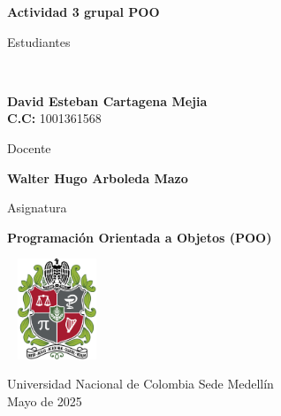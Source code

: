 \begin{titlepage}
	\Large{
	\begin{center}
		\vspace*{1cm}
 
		\textbf{Actividad 3 grupal POO}
 
			 
		\vspace{1.5cm}
		
		Estudiantes
		
		\vspace{0.5cm}
		 \

 
		\textbf{David Esteban Cartagena Mejia} \\
		  \textbf{C.C:} 1001361568 \\	
		  
	 
 
	   \vspace{1cm}
		
		Docente 
		
		\vspace{0.5cm}
 
		\textbf{Walter Hugo Arboleda Mazo}
		\vspace{0.4cm}
		\vspace{1cm}
		
		Asignatura
		
		\vspace{0.5cm}
 
		\textbf{Programación Orientada a Objetos (POO)}
 
		\vfill
 
		\includegraphics[width=3cm,height=3cm]{logo.png}\\[0.2cm]
	  
		\vspace{0.2cm}
	  
				 
		Universidad Nacional de Colombia Sede Medellín\\
		Mayo de 2025
		
	\end{center}
	}
 \end{titlepage}